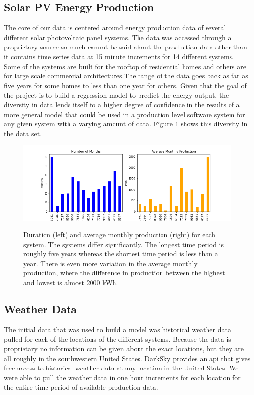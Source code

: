 \documentclass[11pt, fullpage,letterpaper]{article}
\begin{document}
\subsection{Solar PV Energy Production}
The core of our data is centered around energy production data of several different solar photovoltaic panel systems. The data was accessed through a proprietary source so much cannot be said about the production data other than it contains time series data at 15 minute increments for 14 different systems. Some of the systems are built for the rooftop of residential homes and others are for large scale commercial architectures.The range of the data goes back as far as five years for some homes to less than one year for others. Given that the goal of the project is to build a regression model to predict the energy output, the diversity in data lends itself to a higher degree of confidence in the results of a more general model that could be used in a production level software system for any given system with a varying amount of data. Figure \ref{2-1} shows this diversity in the data set. 

\begin{figure}[!htb]
    \includegraphics[width=\textwidth]{2-1}
    \label{2-1} 
    \caption{Duration (left) and average monthly production (right) for each system. The systems differ significantly. The longest time period is roughly five years whereas the shortest time period is less than a year. There is even more variation in the average monthly production, where the difference in production between the highest and lowest is almost 2000 kWh.}
\end{figure}

\subsection{Weather Data}
The initial data that was used to build a model was historical weather data pulled for each of the locations of the different systems. Because the data is proprietary no information can be given about the exact locations, but they are all roughly in the southwestern United States. DarkSky \cite{DarkSky} provides an api that gives free access to historical weather data at any location in the United States. We were able to pull the weather data in one hour increments for each location for the entire time period of available production data.
\end{document}
